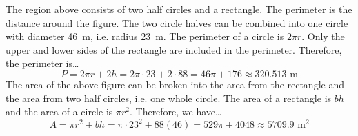 \documentclass[11pt,letterpaper]{article}
\begin{document}
\sol The region above consists of two half circles and a rectangle. The perimeter is the distance around the figure. The two circle halves can be combined into one circle with diameter 46~m, i.e. radius 23~m. The perimeter of a circle is $2\pi r$. Only the upper and lower sides of the rectangle are included in the perimeter. Therefore, the perimeter is\dots
	\[
	P= 2\pi r + 2h= 2 \pi \cdot 23 + 2 \cdot 88= 46\pi + 176 \approx 320.513 \text{ m}
	\]
The area of the above figure can be broken into the area from the rectangle and the area from two half circles, i.e. one whole circle. The area of a rectangle is $bh$ and the area of a circle is $\pi r^2$. Therefore, we have\dots
	\[
	A= \pi r^2 + bh= \pi \cdot 23^2 + 88(46)= 529\pi + 4048 \approx 5709.9 \text{ m}^2
	\]
\end{document}
